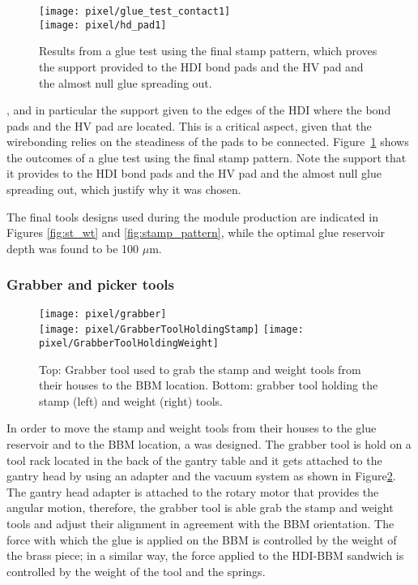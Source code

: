 \begin{figure}[!h]
  \centering  
  \texttt{[image: pixel/glue\_test\_contact1]}\\
  \texttt{[image: pixel/hd\_pad1]}
  \caption[Glue contact area test.]{Results from a glue test using the final stamp pattern, which proves the support provided to the HDI bond pads and the HV pad and the almost null glue spreading out.}\label{fig:glue_test}
\end{figure}

\item {}, and in particular the support given to the edges of the HDI where the bond pads and the HV pad are located. This is a critical aspect, given that the wirebonding relies on the steadiness of the pads to be connected. Figure~\ref{fig:glue_test} shows the outcomes of a glue test using the final stamp pattern. Note the support that it provides to the HDI bond pads and the HV pad and the almost null glue spreading out, which justify why it was chosen.   
\eit

The final tools designs used during the module production are indicated in Figures \ref{fig:st_wt} and \ref{fig:stamp_pattern}, while the optimal glue reservoir depth was found to be 100 $\mu$m. 

\subsubsection*{Grabber and picker tools}

\begin{figure}[!h]
  \centering  
  \texttt{[image: pixel/grabber]}\\
  \texttt{[image: pixel/GrabberToolHoldingStamp]}
  \texttt{[image: pixel/GrabberToolHoldingWeight]}
  \caption[Grabber tool.]{Top: Grabber tool used to grab the stamp and weight tools from their houses to the BBM location. Bottom: grabber tool holding the stamp (left) and weight (right) tools.}\label{fig:grabber_tool}
\end{figure}

In order to move the stamp and weight tools from their houses to the glue reservoir and to the BBM location, a  was designed. The grabber tool is hold on a tool rack located in the back of the gantry table and it gets attached to the gantry head by using an adapter and the vacuum system as shown in Figure\ref{fig:grabber_tool}. The gantry head adapter is attached to the rotary motor that provides the angular motion, therefore, the grabber tool is able grab the stamp and weight tools and adjust their alignment in agreement with the BBM orientation. The force with which the glue is applied on the BBM is controlled by the weight of the brass piece; in a similar way, the force applied to the HDI-BBM sandwich is controlled by the weight of the tool and the springs.                  

